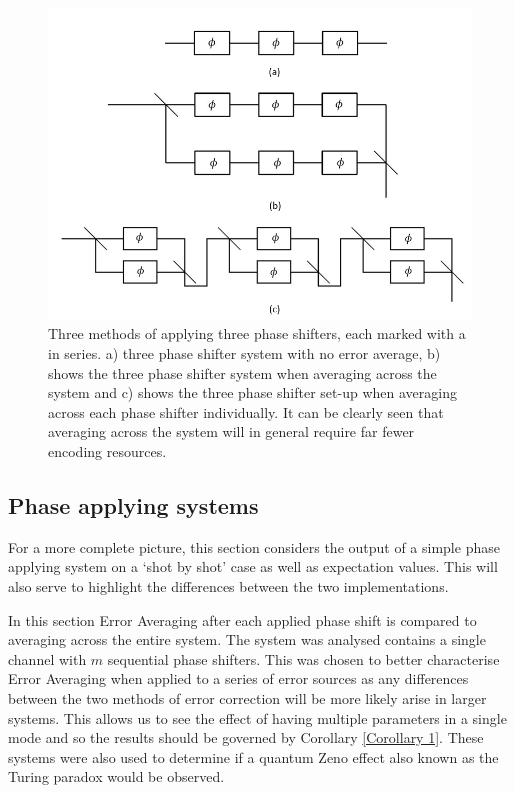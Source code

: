 \documentclass[aps,pra,twocolumn,superscriptaddress,numerical]{revtex4-1}
\begin{document}
		\begin{figure}
			\includegraphics[width=\columnwidth]{three_phase_applying_systems.PNG}
			
			\caption{Three methods of applying three phase shifters, each marked with a
				in series. a) three phase shifter system with no error average, b)
				shows the three phase shifter system when averaging across the system
				and c) shows the three phase shifter set-up when averaging across
				each phase shifter individually. It can be clearly seen that averaging
				across the system will in general require far fewer encoding resources.
				\label{fig:Different methods of implementation}}
			
			
		\end{figure}
		
		\subsection{Phase applying systems\label{Phase applying systems}}
		For a more complete picture, this section considers the output of a simple phase applying system on a `shot by shot' case as well as expectation values. This will also serve to highlight the differences between the two implementations.
		
		In this section Error Averaging after each applied phase shift is compared to averaging across the entire system. The system was analysed contains a single channel with $m$ sequential phase shifters. This was chosen to better characterise Error Averaging when applied to a series of error sources as any differences between the two methods of error correction will be more likely arise in larger systems. This allows us to see the effect of having multiple parameters in a single mode and so the results should be governed by Corollary \ref{Corollary 1}. These systems were also used to determine if a quantum Zeno effect  \cite{expZeno} also known as the Turing paradox would be observed.
		
\end{document}
